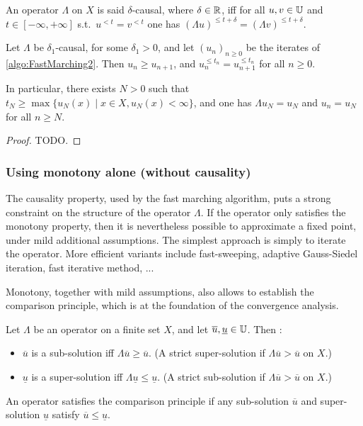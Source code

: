 \begin{definition}
An operator $\Lambda$ on $X$ is said $\delta$-causal, where $\delta\in \mathbb{R}$, iff for all $u,v \in \mathbb{U}$ and $t \in [-\infty,+\infty]$ 
	s.t.\ $u^{<t} = v^{<t}$ one has $ (\Lambda u)^{\leq t+\delta} = (\Lambda v)^{\leq t+\delta}$.
\end{definition}


\begin{proposition}
Let $\Lambda$ be $\delta_1$-causal, for some $\delta_1>0$, and let $(u_n)_{n \geq 0}$ be the iterates of \cref{algo:FastMarching2}. Then $u_n \geq u_{n+1}$, and $u_n^{\leq t_n} = u_{n+1}^{\leq t_n}$ for all $n \geq 0$. 

In particular, there exists $N>0$ such that $t_N \geq \max \{u_N(x)\mid x \in X, u_N(x) < \infty\}$, 
and one has $\Lambda u_N = u_N$ and $u_n = u_N$ for all $n \geq N$. 
\end{proposition}

\begin{proof}
	TODO.
\end{proof}



\subsubsection{Using monotony alone (without causality)}

The causality property, used by the fast marching algorithm, puts a strong constraint on the structure of the operator $\Lambda$. If the operator only satisfies the monotony property, then  it is nevertheless possible to approximate a fixed point, under mild additional assumptions.
The simplest approach is simply to iterate the operator. More efficient variants include fast-sweeping, adaptive Gauss-Siedel iteration, fast iterative method, ...

Monotony, together with mild assumptions, also allows to establish the comparison principle, which is at the foundation of the convergence analysis. 

\begin{definition}
	Let $\Lambda$ be an operator on a finite set $X$, and let $\overline u,\underline u \in \mathbb{U}$. Then : 
	\begin{itemize}
		\item $\overline u$ is a sub-solution iff $\Lambda \overline u \geq \overline u$. 
		(A strict super-solution if $\Lambda \overline u > \overline u$ on $X$.)
		\item $\underline u$ is a super-solution iff $\Lambda \underline u \leq \underline u$. 
		(A strict sub-solution if $\Lambda \overline u > \overline u$ on $X$.)
	\end{itemize}
	
	An operator satisfies the comparison principle if any sub-solution $\overline u$ and super-solution $\underline u$ satisfy $\overline u \leq \underline u$. 
\end{definition}

